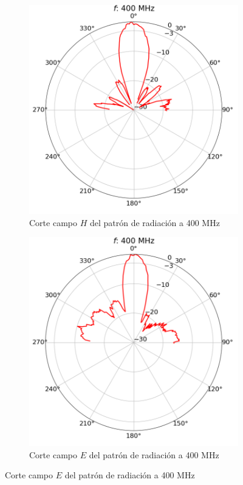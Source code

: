 \begin{figure}[h!]
    \centering
    \begin{subfigure}{0.45\textwidth}
        \includegraphics[width=\textwidth]{img/400rp}
        \caption{Corte campo $H$ del patrón de radiación a 400 MHz}
        \label{fig:400rp}
    \end{subfigure}
    \begin{subfigure}{0.45\textwidth}
        \includegraphics[width=\textwidth]{img/400rpel}
        \caption{Corte campo $E$ del patrón de radiación a 400 MHz}
        \label{fig:400rpel}
    \end{subfigure}
\end{figure}


